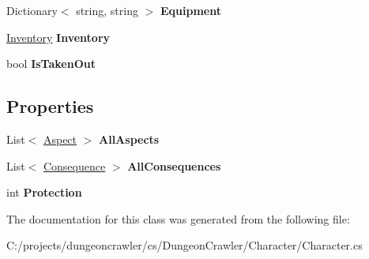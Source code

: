 \begin{DoxyCompactItemize}
\item 
\hypertarget{class_dungeon_crawler_1_1_character_1_1_character_a22cda9a13deb74dd0089970150354c9b}{}Dictionary$<$ string, string $>$ {\bfseries Equipment}\label{class_dungeon_crawler_1_1_character_1_1_character_a22cda9a13deb74dd0089970150354c9b}

\item 
\hypertarget{class_dungeon_crawler_1_1_character_1_1_character_a4a92503c577f806231fe03bafff227d2}{}\hyperlink{class_dungeon_crawler_1_1_character_1_1_inventory}{Inventory} {\bfseries Inventory}\label{class_dungeon_crawler_1_1_character_1_1_character_a4a92503c577f806231fe03bafff227d2}

\item 
\hypertarget{class_dungeon_crawler_1_1_character_1_1_character_aa9be269eb8ea184174ad9e27e06638e7}{}bool {\bfseries Is\+Taken\+Out}\label{class_dungeon_crawler_1_1_character_1_1_character_aa9be269eb8ea184174ad9e27e06638e7}

\end{DoxyCompactItemize}
\subsection*{Properties}
\begin{DoxyCompactItemize}
\item 
\hypertarget{class_dungeon_crawler_1_1_character_1_1_character_a970c74df860573bf88cfa26f6557142f}{}List$<$ \hyperlink{class_dungeon_crawler_1_1_core_1_1_aspect}{Aspect} $>$ {\bfseries All\+Aspects}\label{class_dungeon_crawler_1_1_character_1_1_character_a970c74df860573bf88cfa26f6557142f}

\item 
\hypertarget{class_dungeon_crawler_1_1_character_1_1_character_a4f17349415eb456f583217a8a53257fa}{}List$<$ \hyperlink{class_dungeon_crawler_1_1_character_1_1_consequence}{Consequence} $>$ {\bfseries All\+Consequences}\label{class_dungeon_crawler_1_1_character_1_1_character_a4f17349415eb456f583217a8a53257fa}

\item 
\hypertarget{class_dungeon_crawler_1_1_character_1_1_character_aea7275f0f81c59594d15852f3c1bc5ef}{}int {\bfseries Protection}\label{class_dungeon_crawler_1_1_character_1_1_character_aea7275f0f81c59594d15852f3c1bc5ef}

\end{DoxyCompactItemize}


The documentation for this class was generated from the following file\+:\begin{DoxyCompactItemize}
\item 
C\+:/projects/dungeoncrawler/cs/\+Dungeon\+Crawler/\+Character/Character.\+cs\end{DoxyCompactItemize}
